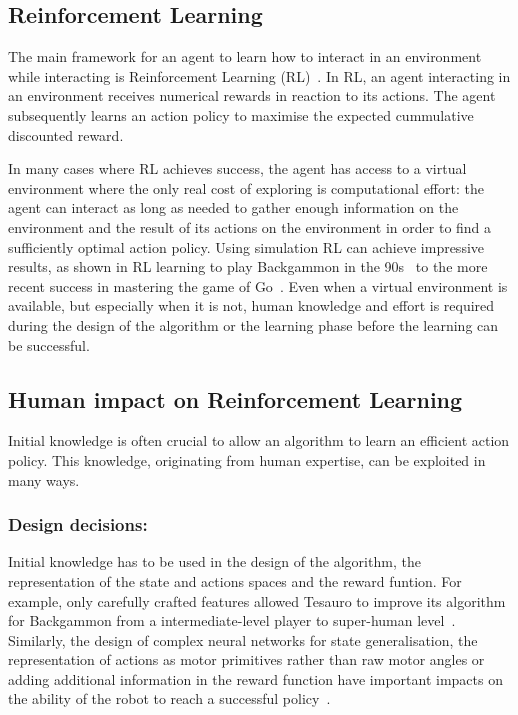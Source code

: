 \documentclass[letterpaper]{article} %
\begin{document}
\subsection{Reinforcement Learning}

The main framework for an agent to learn how to interact in an environment while
interacting is Reinforcement Learning
(RL)~\cite{kober2013reinforcement,sutton1998reinforcement}. In RL, an agent
interacting in an environment receives numerical rewards in reaction to its
actions. The agent subsequently learns an action policy to maximise the expected
cummulative discounted reward.

In many cases where RL achieves success, the agent has access to a virtual
environment where the only real cost of exploring is computational effort: the
agent can interact as long as needed to gather enough information on the
environment and the result of its actions on the environment in order to find a
sufficiently optimal action policy. Using simulation RL can achieve impressive
results, as shown in RL learning to play Backgammon in the
90s~\cite{tesauro1995temporal} to the more recent success in mastering the game
of Go~\cite{silver2016mastering}. Even when a virtual environment is available,
but especially when it is not, human knowledge and effort is required during the
design of the algorithm or the learning phase before the learning can be
successful.

\subsection{Human impact on Reinforcement Learning}

Initial knowledge is often crucial to allow an algorithm to learn an
efficient action policy. This knowledge, originating from human expertise, can
be exploited in many ways. 

\subsubsection{Design decisions:}

Initial knowledge has to be used in the design of the algorithm, the
representation of the state and actions spaces and the reward funtion. For
example, only carefully crafted features allowed Tesauro to improve its
algorithm for Backgammon from a intermediate-level player to super-human
level~\cite{tesauro1995temporal}. Similarly, the design of complex neural
networks for state generalisation, the representation of actions as motor
primitives rather than raw motor angles or adding additional information in the
reward function have important impacts on the ability of the robot to reach a
successful policy~\cite{kober2013reinforcement}.
\end{document}
